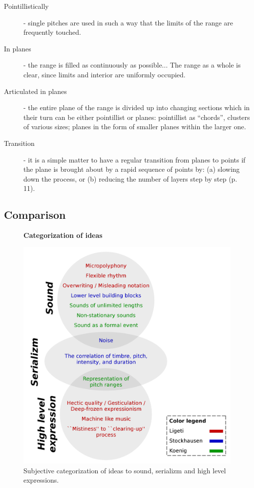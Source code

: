 \documentclass[a4paper,11pt]{article}
\newenvironment{MyShadequote}[1][]{%
    \ignorespaces%
    \begin{mdframed}[style=MyShadeQuoteStyle,#1]%
}{%
    \end{mdframed}%
    \ignorespacesafterend%
}%
\begin{document}
\begin{MyShadequote}
  \begin{description}
    \item[Pointillistically] - single pitches are used in such a way that the limits of the range are frequently touched.

    \item[In planes] - the range is filled as continuously as possible...
    The range as a whole is clear, since limits and interior are uniformly occupied.

    \item[Articulated in planes] - the entire plane of the range is divided up into changing sections which in their turn can be either pointillist or planes:
    pointillist as ``chords'', clusters of various sizes;
    planes in the form of smaller planes within the larger one.

    \item[Transition] - it is a simple matter to have a regular transition from planes to points if the plane is brought about by a rapid sequence of points by:
    (a) slowing down the process,
    or (b) reducing the number of layers step by step (p. 11).
  \end{description}

\end{MyShadequote}

\subsection{Comparison}

\begin{figure}[!htb]
  \centering
  \textbf{Categorization of ideas}\par\medskip
  \includegraphics[width=\linewidth]{graphics/concepts_categorization.pdf}
  \caption{Subjective categorization of ideas to sound, serializm and high level expressions.}
  \label{fig:concepts_categorization}
\end{figure}
\end{document}
